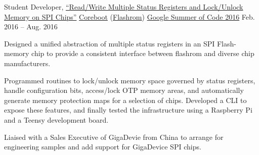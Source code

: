 \begin{cvexperience}
\cvposition
	{Student Developer, \href{https://drive.google.com/drive/u/1/folders/0B-Cccp-WWmeuUlh5M3pxT0cyQm8}{``Read/Write Multiple Status Registers and Lock/Unlock Memory on SPI Chips''}} %
	{\href{https://www.coreboot.org}{Coreboot} (\href{https://www.flashrom.org/Flashrom}{Flashrom})} %
	{} %
	{\href{https://summerofcode.withgoogle.com/archive/2016/projects/5439533130711040/}{Google Summer of Code 2016}} %
	{Feb. 2016 -- Aug. 2016} %
	{\begin{cvitems} %
		\item {Designed a unified abstraction of multiple status registers in an SPI Flash-memory chip to provide a consistent interface between flashrom and diverse chip manufacturers.}
		\item {Programmed routines to lock/unlock memory space governed by status registers, handle configuration bits, access/lock OTP memory areas, and automatically generate memory protection maps for a selection of chips. Developed a CLI to expose these features, and finally tested the infrastructure using a Raspberry Pi and a Teensy development board.}
  		\item {Liaised with a Sales Executive of GigaDevie from China to arrange for engineering samples and add support for GigaDevice SPI chips.}
	\end{cvitems}}


\end{cvexperience}
